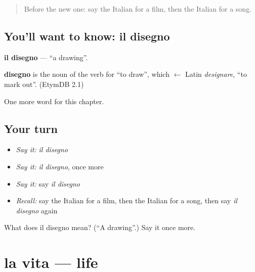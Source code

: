 \label{lesson:IT-C116-disegno}



\begin{quote}
Before the new one: say the Italian for a film, then the Italian for a song.
\end{quote}

\subsection*{You'll want to know: il disegno}
\textbf{il disegno} — \textquotedblleft{}a drawing\textquotedblright{}.

\begin{cousinweb}
\textbf{disegno} is the noun of the verb for \textquotedblleft{}to draw\textquotedblright{}, which $\leftarrow$ Latin \emph{designare}, \textquotedblleft{}to mark out\textquotedblright{}. (EtymDB 2.1)
\end{cousinweb}

\begin{grammarlens}[title={What you've built}]
One more word for this chapter.
\end{grammarlens}

\subsection*{Your turn}
\begin{itemize}
\raggedright
  \item \emph{Say it:} \emph{il disegno}
  \item \emph{Say it:} \emph{il disegno}, once more
  \item \emph{Say it:} say \emph{il disegno}
  \item \emph{Recall:} say the Italian for a film, then the Italian for a song, then say \emph{il disegno} again
\end{itemize}

\begin{tcolorbox}[breakable,colback=teal!4,colframe=teal!35!black,title={Before you move on}]
What does il disegno mean? (\textquotedblleft{}A drawing\textquotedblright{}.) Say it once more.
\end{tcolorbox}
\section[la vita]{la vita — life}

\label{lesson:IT-C116-vita}



